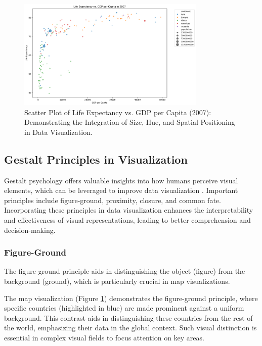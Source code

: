 \begin{figure}[h]
    \centering
\includegraphics[width=0.8\textwidth]{images/plots/lo2_life_exp_vs_gdp_cap_2007.png}
    \caption{Scatter Plot of Life Expectancy vs. GDP per Capita (2007): Demonstrating the Integration of Size, Hue, and Spatial Positioning in Data Visualization.}
    \label{fig:lo2_scatter_plot}
\end{figure}

\subsection{Gestalt Principles in Visualization}
Gestalt psychology offers valuable insights into how humans perceive visual elements, which can be leveraged to improve data visualization \cite{kohlerGestaltPsychology1929}. Important principles include figure-ground, proximity, closure, and common fate. Incorporating these principles in data visualization enhances the interpretability and effectiveness of visual representations, leading to better comprehension and decision-making.

\subsubsection{Figure-Ground}
The figure-ground principle aids in distinguishing the object (figure) from the background (ground), which is particularly crucial in map visualizations.

The map visualization (Figure \ref{fig:lo2_scatter_plot}) demonstrates the figure-ground principle, where specific countries (highlighted in blue) are made prominent against a uniform background. This contrast aids in distinguishing these countries from the rest of the world, emphasizing their data in the global context. Such visual distinction is essential in complex visual fields to focus attention on key areas.

